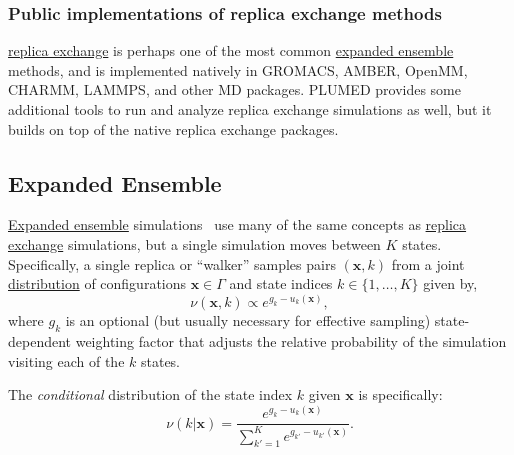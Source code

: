\documentclass[9pt,review]{livecoms}
\newcommand{\vx}{\mathbf{x}}
\begin{document}
\subsubsection{Public implementations of replica exchange methods}

\hyperlink{ref:ReplEx} {replica exchange} is perhaps one of the most common \hyperlink{ref:ExpEns} {expanded ensemble} methods, and is implemented natively in GROMACS, AMBER, OpenMM, CHARMM, LAMMPS, and other MD packages. PLUMED provides some additional tools to run and analyze replica exchange simulations as well, but it builds on top of the native replica exchange packages.

\subsection{Expanded Ensemble}
\hyperlink{ref:ExpEns} {Expanded ensemble} simulations~\cite{lyubartsev:jcp:1992:expanded-ensembles} use many of the same concepts as \hyperlink{ref:ReplEx} {replica exchange} simulations, but a single simulation moves between $K$ states. Specifically, a single replica or ``walker'' samples pairs $(\vx,k)$ from a joint \hyperlink{ref:Distribution} {distribution}  of configurations $\vx \in \Gamma$ and state indices $k \in \{1,\ldots,K\}$ given by,
\begin{equation}
\nu(\vx,k) \propto e^{g_k-u_k(\vx)},
\end{equation}
where $g_k$ is an optional (but usually necessary for effective sampling) state-dependent weighting factor that adjusts the relative probability of the simulation visiting each of the $k$ states.

The \emph{conditional} distribution of the state index $k$ given $\vx$ is specifically:
\begin{equation}
\nu(k | \vx) = \frac{e^{g_k - u_k(\vx)}}{\sum\limits_{k'=1}^K e^{g_{k'} - u_{k'}(\vx)}}.
\end{equation}
\end{document}
